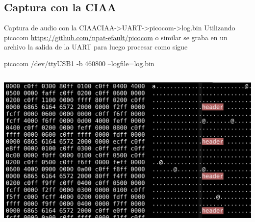 \subsection{Captura con la CIAA}
 \begin{frame}{Captura de audio con la CIAA}{CIAA->UART->picocom->log.bin}
    \handsonicon
    Utilizando picocom
    \tiny
    \href{https://github.com/npat-efault/picocom}{https://github.com/npat-efault/picocom}
    \normalsize
    o similar se graba en un archivo la salida de la UART para luego procesar como sigue
    \begin{block}{\tiny{picocom /dev/ttyUSB1 -b 460800 --logfile=log.bin}}
    \end{block}
    \begin{columns}[onlytextwidth]
       
       \includegraphics[width=1.0\textwidth]{2_clase/log.png}
    \end{columns}
    \vfill
 \end{frame}
